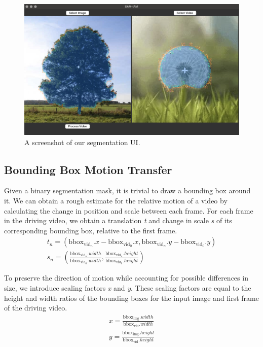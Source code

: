 \begin{figure}[t]
    \centering
    \includegraphics[width=1\linewidth]{media/ui.png}
    \caption{A screenshot of our segmentation UI.}
    \label{fig:ui}
\end{figure}

\subsection{Bounding Box Motion Transfer}


Given a binary segmentation mask, it is trivial to draw a bounding box around it. We can obtain a rough estimate for the relative motion of a video by calculating the change in position and scale between each frame.
For each frame in the driving video, we obtain a translation \textit{t} and change in scale \textit{s} of its corresponding bounding box, relative to the first frame.
\begin{equation}
    \begin{gathered}
        t_{n} = (\text{bbox}_{\text{vid}_n}.x-\text{bbox}_{\text{vid}_0}.x, \text{bbox}_{\text{vid}_n}.y-\text{bbox}_{\text{vid}_0}.y) \\
        s_{n} = (\frac{\text{bbox}_{\text{vid}_n}.width}{\text{bbox}_{\text{vid}_0}.width},\frac{\text{bbox}_{\text{vid}_n}.height}{\text{bbox}_{\text{vid}_0}.height})
    \end{gathered}
    \label{eq:transformation}
\end{equation}

To preserve the direction of motion while accounting for possible differences in size, we introduce scaling factors \textit{x} and \textit{y}.
These scaling factors are equal to the height and width ratios of the bounding boxes for the input image and first frame of the driving video.
\begin{equation}
    \begin{gathered}
        x = \frac{\text{bbox}_\text{img}.width}{\text{bbox}_\text{vid}.width} \\ y = \frac{\text{bbox}_\text{img}.height}{\text{bbox}_\text{vid}.height}
    \end{gathered}
    \label{eq:scaling}
\end{equation}

